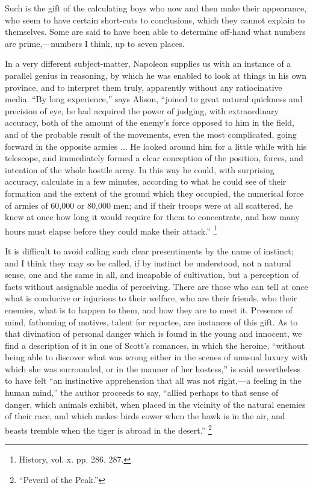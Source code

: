 Such is the gift of the calculating boys who now and then make
their appearance, who seem to have certain short-cuts to conclusions,
which they cannot explain to themselves. Some are said to have been
able to determine off-hand what numbers are prime,—numbers I think,
up to seven places.

In a very different subject-matter, Napoleon supplies us with an
instance of a parallel genius in reasoning, by which he was enabled to
look at things in his own province, and to interpret them truly,
apparently without any ratiocinative media. ``By long
experience,'' says Alison, ``joined to great natural quickness
and precision of eye, he had acquired the power of judging, with
extraordinary accuracy, both of the amount of the enemy's force
opposed to him in the field, and of the probable result of the
movements, even the most complicated, going forward in the opposite
armies ... He looked around him for a little while with his telescope,
and immediately formed a clear conception of the position, forces, and
intention of the whole hostile array. In this way he could, with
surprising accuracy, calculate in a few minutes, according to what he
could see of their formation and the extent of the ground which they
occupied, the numerical force of armies of 60,000 or 80,000 men; and
if their troops were at all scattered, he knew at once how long it
would require for them to concentrate, and how many hours must elapse
before they could make their attack.'' \footnote{History, vol.
x. pp. 286, 287.}

It is difficult to avoid calling such clear presentiments by the
name of instinct; and I think they may so be called, if by instinct be
understood, not a natural sense, one and the same in all, and
incapable of cultivation, but a perception of facts without assignable
media of perceiving. There are those who can tell at once what is
conducive or injurious to their welfare, who are their friends,
who their enemies, what is to happen to them, and how they are to meet
it. Presence of mind, fathoming of motives, talent for repartee, are
instances of this gift. As to that divination of personal danger which
is found in the young and innocent, we find a description of it in one
of Scott's romances, in which the heroine, ``without being able to
discover what was wrong either in the scenes of unusual luxury with
which she was surrounded, or in the manner of her hostess,'' is
said nevertheless to have felt ``an instinctive apprehension that
all was not right,—a feeling in the human mind,'' the author
proceeds to say, ``allied perhaps to that sense of danger, which
animals exhibit, when placed in the vicinity of the natural enemies of
their race, and which makes birds cower when the hawk is in the air,
and beasts tremble when the tiger is abroad in the desert.'' \footnote{``Peveril
of the Peak.''}

